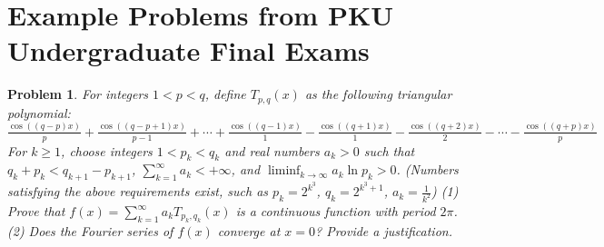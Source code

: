 \documentclass[11pt]{article}
\numberwithin{equation}{section}
\newtheorem{thm}{Problem}
\begin{document}
\begin{table}[h]
\label{tab:score_crtr}
\centering
{}
\caption{Scoring criteria for the undergraduate exams.}
\end{table}


\section{Example Problems from PKU Undergraduate Final Exams}\label{sec:exam}


\begin{thm}
For integers $1 < p < q$, define $T_{p, q}(x)$ as the following triangular polynomial: $\frac{\cos((q-p)x)}{p} + \frac{\cos((q-p+1)x)}{p-1} + \cdots + \frac{\cos((q-1)x)}{1} - \frac{\cos((q+1)x)}{1} - \frac{\cos((q+2)x)}{2} - \cdots - \frac{\cos((q+p)x)}{p}$ For $k \geq 1$, choose integers $1 < p_k < q_k$ and real numbers $a_k > 0$ such that $q_k + p_k < q_{k+1} - p_{k+1}$, $\sum_{k=1}^{\infty} a_k < +\infty$, and $\liminf_{k \to \infty} a_k \ln p_k > 0$. (Numbers satisfying the above requirements exist, such as $p_k = 2^{k^3}$, $q_k = 2^{k^3 + 1}$, $a_k = \frac{1}{k^2}$) (1) Prove that $f(x) = \sum_{k=1}^{\infty} a_k T_{p_k, q_k}(x)$ is a continuous function with period $2\pi$. (2) Does the Fourier series of $f(x)$ converge at $x = 0$? Provide a justification.
\end{thm}
\end{document}
